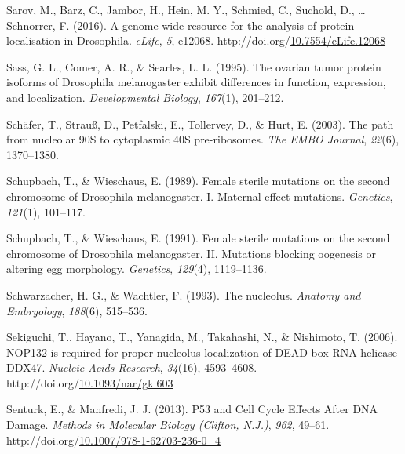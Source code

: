 \documentclass[12pt,oneside]{reedthesis}
\newlength{\cslhangindent}
\newenvironment{CSLReferences}[2] %
 {%
  \setlength{\parindent}{0pt}
  \ifodd #1 \everypar{\setlength{\hangindent}{\cslhangindent}}\ignorespaces\fi
  \ifnum #2 > 0
  \setlength{\parskip}{#2\baselineskip}
  \fi
 }%
 {}
\begin{document}
\begin{CSLReferences}{1}{0}
\leavevmode{}%
Sarov, M., Barz, C., Jambor, H., Hein, M. Y., Schmied, C., Suchold, D., \ldots{} Schnorrer, F. (2016). A genome-wide resource for the analysis of protein localisation in {Drosophila}. \emph{eLife}, \emph{5}, e12068. http://doi.org/\href{https://doi.org/10.7554/eLife.12068}{10.7554/eLife.12068}

\leavevmode{}%
Sass, G. L., Comer, A. R., \& Searles, L. L. (1995). The ovarian tumor protein isoforms of {Drosophila} melanogaster exhibit differences in function, expression, and localization. \emph{Developmental Biology}, \emph{167}(1), 201--212.

\leavevmode{}%
Schäfer, T., Strauß, D., Petfalski, E., Tollervey, D., \& Hurt, E. (2003). The path from nucleolar {90S} to cytoplasmic {40S} pre-ribosomes. \emph{The EMBO Journal}, \emph{22}(6), 1370--1380.

\leavevmode{}%
Schupbach, T., \& Wieschaus, E. (1989). Female sterile mutations on the second chromosome of {Drosophila} melanogaster. {I}. {Maternal} effect mutations. \emph{Genetics}, \emph{121}(1), 101--117.

\leavevmode{}%
Schupbach, T., \& Wieschaus, E. (1991). Female sterile mutations on the second chromosome of {Drosophila} melanogaster. {II}. {Mutations} blocking oogenesis or altering egg morphology. \emph{Genetics}, \emph{129}(4), 1119--1136.

\leavevmode{}%
Schwarzacher, H. G., \& Wachtler, F. (1993). The nucleolus. \emph{Anatomy and Embryology}, \emph{188}(6), 515--536.

\leavevmode{}%
Sekiguchi, T., Hayano, T., Yanagida, M., Takahashi, N., \& Nishimoto, T. (2006). {NOP132} is required for proper nucleolus localization of {DEAD}-box {RNA} helicase {DDX47}. \emph{Nucleic Acids Research}, \emph{34}(16), 4593--4608. http://doi.org/\href{https://doi.org/10.1093/nar/gkl603}{10.1093/nar/gkl603}

\leavevmode{}%
Senturk, E., \& Manfredi, J. J. (2013). P53 and {Cell Cycle Effects After DNA Damage}. \emph{Methods in Molecular Biology (Clifton, N.J.)}, \emph{962}, 49--61. http://doi.org/\href{https://doi.org/10.1007/978-1-62703-236-0_4}{10.1007/978-1-62703-236-0\_4}


\end{CSLReferences}
\end{document}
